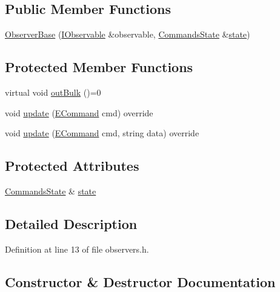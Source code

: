 \subsection*{Public Member Functions}
\begin{DoxyCompactItemize}
\item 
\hyperlink{struct_observer_base_ade5a5f743b630b7a3a06c097e7f48aa8}{Observer\+Base} (\hyperlink{struct_i_observable}{I\+Observable} \&observable, \hyperlink{class_commands_state}{Commands\+State} \&\hyperlink{struct_observer_base_a107ad54040309605fa5fafd481b97f2f}{state})
\end{DoxyCompactItemize}
\subsection*{Protected Member Functions}
\begin{DoxyCompactItemize}
\item 
virtual void \hyperlink{struct_observer_base_acf405ad8b991810572d0c2425f782b36}{out\+Bulk} ()=0
\item 
void \hyperlink{struct_observer_base_ae178c765ecda0166fd784dcb4ebe0a40}{update} (\hyperlink{interface_8h_aa299181f275f76f11365a410f7429098}{E\+Command} cmd) override
\item 
void \hyperlink{struct_observer_base_adeede05d3ddea8da1148cdce92f07787}{update} (\hyperlink{interface_8h_aa299181f275f76f11365a410f7429098}{E\+Command} cmd, string data) override
\end{DoxyCompactItemize}
\subsection*{Protected Attributes}
\begin{DoxyCompactItemize}
\item 
\hyperlink{class_commands_state}{Commands\+State} \& \hyperlink{struct_observer_base_a107ad54040309605fa5fafd481b97f2f}{state}
\end{DoxyCompactItemize}


\subsection{Detailed Description}


Definition at line 13 of file observers.\+h.



\subsection{Constructor \& Destructor Documentation}
